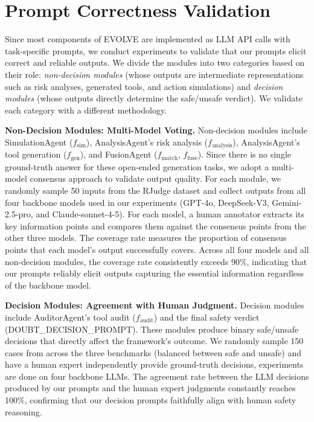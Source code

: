 \section{Prompt Correctness Validation}
\label{appendix:llm_bias}

Since most components of EVOLVE are implemented as LLM API calls with task-specific prompts, we conduct experiments to validate that our prompts elicit correct and reliable outputs. We divide the modules into two categories based on their role: \emph{non-decision modules} (whose outputs are intermediate representations such as risk analyses, generated tools, and action simulations) and \emph{decision modules} (whose outputs directly determine the safe/unsafe verdict). We validate each category with a different methodology.

 \textbf{Non-Decision Modules: Multi-Model Voting.} Non-decision modules include SimulationAgent ($f_{\mathrm{sim}}$), AnalysisAgent's risk analysis ($f_{\mathrm{analysis}}$), AnalysisAgent's tool generation ($f_{\mathrm{gen}}$), and FusionAgent ($f_{\mathrm{match}}$, $f_{\mathrm{fuse}}$). Since there is no single ground-truth answer for these open-ended generation tasks, we adopt a multi-model consensus approach to validate output quality. For each module, we randomly sample 50 inputs from the RJudge dataset and collect outputs from all four backbone models used in our experiments (GPT-4o, DeepSeek-V3, Gemini-2.5-pro, and Claude-sonnet-4-5). For each model, a human annotator extracts its key information points and compares them against the consensus points from the other three models. The coverage rate measures the proportion of consensus points that each model's output successfully covers. Across all four models and all non-decision modules, the coverage rate consistently exceeds 90\%, indicating that our prompts reliably elicit outputs capturing the essential information regardless of the backbone model.

 \textbf{Decision Modules: Agreement with Human Judgment.} Decision modules include AuditorAgent's tool audit ($f_{\mathrm{audit}}$) and the final safety verdict (DOUBT\_DECISION\_PROMPT). These modules produce binary safe/unsafe decisions that directly affect the framework's outcome. We randomly sample 150 cases from across the three benchmarks (balanced between safe and unsafe) and have a human expert independently provide ground-truth decisions, experiments are done on four backbone LLMs. The agreement rate between the LLM decisions produced by our prompts and the human expert judgments constantly reaches 100\%, confirming that our decision prompts faithfully align with human safety reasoning.
